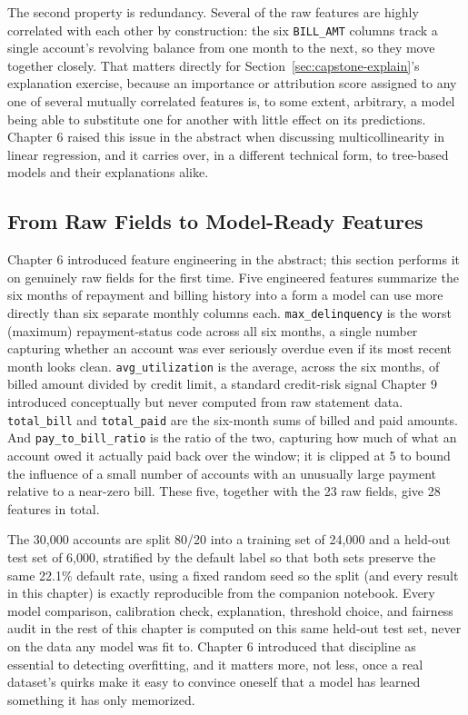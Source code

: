 \documentclass[../ai_in_finance]{subfiles}
\begin{document}
The second property is redundancy. Several of the raw features are highly correlated with each other by construction: the six \texttt{BILL\_AMT} columns track a single account's revolving balance from one month to the next, so they move together closely. That matters directly for Section~\ref{sec:capstone-explain}'s explanation exercise, because an importance or attribution score assigned to any one of several mutually correlated features is, to some extent, arbitrary, a model being able to substitute one for another with little effect on its predictions. Chapter 6 raised this issue in the abstract when discussing multicollinearity in linear regression, and it carries over, in a different technical form, to tree-based models and their explanations alike.

\subsection{From Raw Fields to Model-Ready Features}
\label{sec:capstone-features}

Chapter 6 introduced feature engineering in the abstract; this section performs it on genuinely raw fields for the first time. Five engineered features summarize the six months of repayment and billing history into a form a model can use more directly than six separate monthly columns each. \texttt{max\_\allowbreak delinquency} is the worst (maximum) repayment-status code across all six months, a single number capturing whether an account was ever seriously overdue even if its most recent month looks clean. \texttt{avg\_utilization} is the average, across the six months, of billed amount divided by credit limit, a standard credit-risk signal Chapter 9 introduced conceptually but never computed from raw statement data. \texttt{total\_bill} and \texttt{total\_paid} are the six-month sums of billed and paid amounts. And \texttt{pay\_to\_bill\_ratio} is the ratio of the two, capturing how much of what an account owed it actually paid back over the window; it is clipped at 5 to bound the influence of a small number of accounts with an unusually large payment relative to a near-zero bill. These five, together with the 23 raw fields, give 28 features in total.

The 30,000 accounts are split 80/20 into a training set of 24,000 and a held-out test set of 6,000, stratified by the default label so that both sets preserve the same 22.1\% default rate, using a fixed random seed so the split (and every result in this chapter) is exactly reproducible from the companion notebook. Every model comparison, calibration check, explanation, threshold choice, and fairness audit in the rest of this chapter is computed on this same held-out test set, never on the data any model was fit to. Chapter 6 introduced that discipline as essential to detecting overfitting, and it matters more, not less, once a real dataset's quirks make it easy to convince oneself that a model has learned something it has only memorized.
\end{document}
